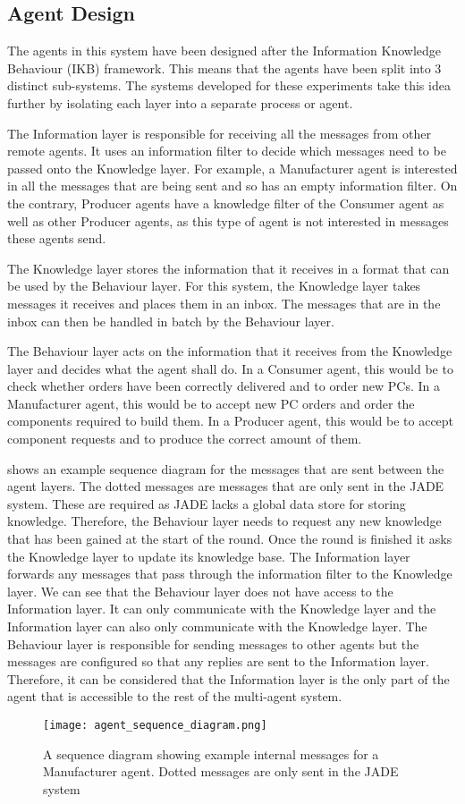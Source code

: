 \subsection{Agent Design}

The agents in this system have been designed after the Information Knowledge Behaviour (IKB) framework.
This means that the agents have been split into 3 distinct sub-systems.
The systems developed for these experiments take this idea further by isolating each layer into a separate process or agent.

The Information layer is responsible for receiving all the messages from other remote agents.
It uses an information filter to decide which messages need to be passed onto the Knowledge layer.
For example, a Manufacturer agent is interested in all the messages that are being sent and so has an empty information filter.
On the contrary, Producer agents have a knowledge filter of the Consumer agent as well as other Producer agents, as this type of agent is not interested in messages these agents send.

The Knowledge layer stores the information that it receives in a format that can be used by the Behaviour layer.
For this system, the Knowledge layer takes messages it receives and places them in an inbox.
The messages that are in the inbox can then be handled in batch by the Behaviour layer.

The Behaviour layer acts on the information that it receives from the Knowledge layer and decides what the agent shall do.
In a Consumer agent, this would be to check whether orders have been correctly delivered and to order new PCs.
In a Manufacturer agent, this would be to accept new PC orders and order the components required to build them.
In a Producer agent, this would be to accept component requests and to produce the correct amount of them.

 shows an example sequence diagram for the messages that are sent between the agent layers.
The dotted messages are messages that are only sent in the JADE system.
These are required as JADE lacks a global data store for storing knowledge.
Therefore, the Behaviour layer needs to request any new knowledge that has been gained at the start of the round.
Once the round is finished it asks the Knowledge layer to update its knowledge base.
The Information layer forwards any messages that pass through the information filter to the Knowledge layer.
We can see that the Behaviour layer does not have access to the Information layer.
It can only communicate with the Knowledge layer and the Information layer can also only communicate with the Knowledge layer.
The Behaviour layer is responsible for sending messages to other agents but the messages are configured so that any replies are sent to the Information layer.
Therefore, it can be considered that the Information layer is the only part of the agent that is accessible to the rest of the multi-agent system.

\begin{figure}[ht]
    \centering
    \texttt{[image: agent\_sequence\_diagram.png]}
    \caption{A sequence diagram showing example internal messages for a Manufacturer agent. Dotted messages are only sent in the JADE system}\label{fig:agent_sequence_diagram}
\end{figure}
